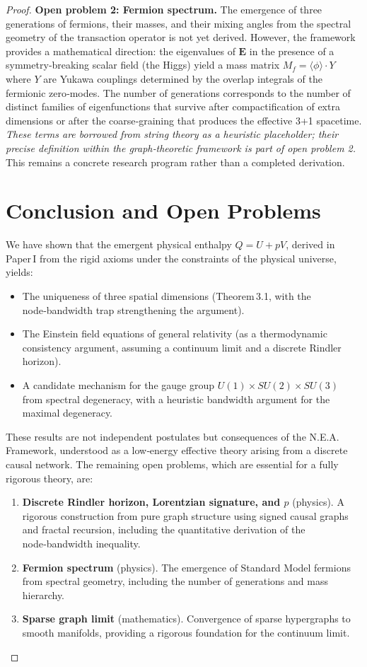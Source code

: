 \documentclass{article}
\begin{document}
\begin{proof}
\textbf{Open problem 2: Fermion spectrum.} The emergence of three generations of fermions, their masses, and their mixing angles from the spectral geometry of the transaction operator is not yet derived. However, the framework provides a mathematical direction: the eigenvalues of $\mathbf{E}$ in the presence of a symmetry‑breaking scalar field (the Higgs) yield a mass matrix $M_f = \langle \phi \rangle \cdot Y$ where $Y$ are Yukawa couplings determined by the overlap integrals of the fermionic zero‑modes. The number of generations corresponds to the number of distinct families of eigenfunctions that survive after compactification of extra dimensions or after the coarse‑graining that produces the effective 3+1 spacetime. \textit{These terms are borrowed from string theory as a heuristic placeholder; their precise definition within the graph‑theoretic framework is part of open problem 2.} This remains a concrete research program rather than a completed derivation.

\section{Conclusion and Open Problems}
We have shown that the emergent physical enthalpy $Q = U + pV$, derived in Paper I from the rigid axioms under the constraints of the physical universe, yields:
\begin{itemize}
    \item The uniqueness of three spatial dimensions (Theorem 3.1, with the node‑bandwidth trap strengthening the argument).
    \item The Einstein field equations of general relativity (as a thermodynamic consistency argument, assuming a continuum limit and a discrete Rindler horizon).
    \item A candidate mechanism for the gauge group $U(1) \times SU(2) \times SU(3)$ from spectral degeneracy, with a heuristic bandwidth argument for the maximal degeneracy.
\end{itemize}
These results are not independent postulates but consequences of the N.E.A. Framework, understood as a low‑energy effective theory arising from a discrete causal network. The remaining open problems, which are essential for a fully rigorous theory, are:
\begin{enumerate}
    \item \textbf{Discrete Rindler horizon, Lorentzian signature, and $p$} (physics). A rigorous construction from pure graph structure using signed causal graphs and fractal recursion, including the quantitative derivation of the node‑bandwidth inequality.
    \item \textbf{Fermion spectrum} (physics). The emergence of Standard Model fermions from spectral geometry, including the number of generations and mass hierarchy.
    \item \textbf{Sparse graph limit} (mathematics). Convergence of sparse hypergraphs to smooth manifolds, providing a rigorous foundation for the continuum limit.
\end{enumerate}


\end{proof}
\end{document}
